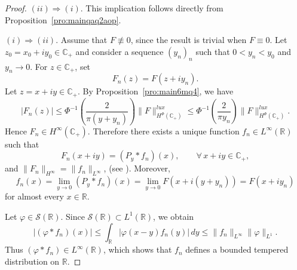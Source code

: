 \documentclass[a4paper,12pt,intlimits,oneside]{amsart}
\theoremstyle{definition}
\numberwithin{equation}{section}
\theoremstyle{definition}
\begin{document}
\begin{proof}
\noindent
$(ii)\Rightarrow(i)$.
This implication follows directly from Proposition~\ref{pro:mainqaq2aop}.

\medskip

\noindent
$(i)\Rightarrow(ii)$.
Assume that $F\not\equiv 0$, since the result is trivial when $F\equiv 0$.
Let $z_{0}=x_{0}+iy_{0}\in\mathbb{C}_{+}$ and consider a sequence 
$(y_{n})_{n}$ such that $0<y_{n}<y_{0}$ and $y_{n}\to 0$. 
For $z\in\mathbb{C}_{+}$, set
\[
F_{n}(z)=F(z+i y_{n}).
\]
Let $z=x+iy\in\mathbb{C}_{+}$. By Proposition~\ref{pro:main6mq4}, we have
\[
|F_{n}(z)|
\leq 
\Phi^{-1}\!\left(\frac{2}{\pi (y+y_{n})}\right)
\|F\|_{H^{\Phi}(\mathbb{C}_{+})}^{lux}
\leq 
\Phi^{-1}\!\left(\frac{2}{\pi y_{n}}\right)
\|F\|_{H^{\Phi}(\mathbb{C}_{+})}^{lux}.
\]
Hence $F_{n}\in H^{\infty}(\mathbb{C}_{+})$. 
Therefore there exists a unique function $f_{n}\in L^{\infty}(\mathbb{R})$ such that
\begin{equation}\label{eq:ualp5son}
F_{n}(x+iy)=(P_{y}\ast f_{n})(x),
\qquad \forall\, x+iy\in\mathbb{C}_{+},
\end{equation}
and $\|F_{n}\|_{H^{\infty}}=\|f_{n}\|_{L^{\infty}}$, (see \cite[Theorem 11.6]{javadmas}).  Moreover,
\[
f_{n}(x)
=\lim_{y\to 0}(P_{y}\ast f_{n})(x)
=\lim_{y\to 0}F(x+i(y+y_{n}))
=F(x+i y_{n})
\]
for almost every $x\in\mathbb{R}$.

Let $\varphi\in\mathscr{S}(\mathbb{R})$. 
Since $\mathscr{S}(\mathbb{R})\subset L^{1}(\mathbb{R})$, we obtain
\[
|(\varphi\ast f_{n})(x)|
\le 
\int_{\mathbb{R}}|\varphi(x-y)f_{n}(y)|\,dy
\le 
\|f_{n}\|_{L^{\infty}}\|\varphi\|_{L^{1}}.
\]
Thus $(\varphi\ast f_{n})\in L^{\infty}(\mathbb{R})$, which shows that $f_{n}$ defines a bounded tempered distribution on $\mathbb{R}$.


\end{proof}
\end{document}
